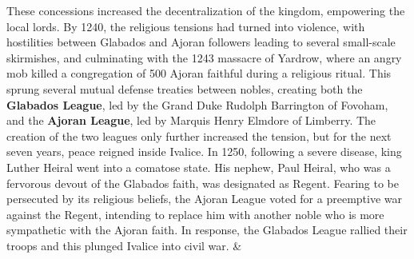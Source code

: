These concessions increased the decentralization of the kingdom, empowering the local lords.
By 1240, the religious tensions had turned into violence, with hostilities between Glabados and Ajoran followers leading to several small-scale skirmishes, and culminating with the 1243 massacre of Yardrow, where an angry mob killed a congregation of 500 Ajoran faithful during a religious ritual. 
This sprung several mutual defense treaties between nobles, creating both the \textbf{Glabados League}, led by the Grand Duke Rudolph Barrington of Fovoham, and the \textbf{Ajoran League}, led by Marquis Henry Elmdore of Limberry. 
The creation of the two leagues only further increased the tension, but for the next seven years, peace reigned inside Ivalice.
In 1250, following a severe disease, king Luther Heiral went into a comatose state. 
His nephew, Paul Heiral, who was a fervorous devout of the Glabados faith, was designated as Regent. 
Fearing to be persecuted by its religious beliefs, the Ajoran League voted for a preemptive war against the Regent, intending to replace him with another noble who is more sympathetic with the Ajoran faith. 
In response, the Glabados League rallied their troops and this plunged Ivalice into civil war.
%
%
\clearpage
%
%
%
{ & }

